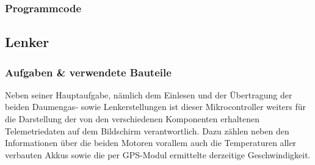 \newpage
\subsubsection{Programmcode}

\newpage
\subsection{Lenker}
\subsubsection{Aufgaben \& verwendete Bauteile}
Neben seiner Hauptaufgabe, nämlich dem Einlesen und der Übertragung der beiden Daumengas- sowie Lenkerstellungen ist dieser Mikrocontroller weiters für die Darstellung der von den verschiedenen Komponenten erhaltenen Telemetriedaten auf dem Bildschirm verantwortlich.
Dazu zählen neben den Informationen über die beiden Motoren vorallem auch die Temperaturen aller verbauten Akkus sowie die per GPS-Modul ermittelte derzeitige Geschwindigkeit.

